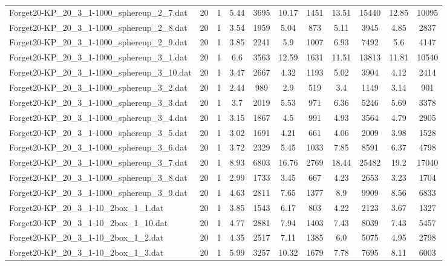 \begin{table}[!ht]
\begin{tabular}{lcccccccccc}
Forget20-KP\_20\_3\_1-1000\_sphereup\_2\_7.dat & 20 & 1 & 5.44 & 3695 & 10.17 & 1451 & 13.51 & 15440 & 12.85 & 10095 \\
Forget20-KP\_20\_3\_1-1000\_sphereup\_2\_8.dat & 20 & 1 & 3.54 & 1959 & 5.04 & 873 & 5.11 & 3945 & 4.85 & 2837 \\
Forget20-KP\_20\_3\_1-1000\_sphereup\_2\_9.dat & 20 & 1 & 3.85 & 2241 & 5.9 & 1007 & 6.93 & 7492 & 5.6 & 4147 \\
Forget20-KP\_20\_3\_1-1000\_sphereup\_3\_1.dat & 20 & 1 & 6.6 & 3563 & 12.59 & 1631 & 11.51 & 13813 & 11.81 & 10540 \\
Forget20-KP\_20\_3\_1-1000\_sphereup\_3\_10.dat & 20 & 1 & 3.47 & 2667 & 4.32 & 1193 & 5.02 & 3904 & 4.12 & 2414 \\
Forget20-KP\_20\_3\_1-1000\_sphereup\_3\_2.dat & 20 & 1 & 2.44 & 989 & 2.9 & 519 & 3.4 & 1149 & 3.14 & 901 \\
Forget20-KP\_20\_3\_1-1000\_sphereup\_3\_3.dat & 20 & 1 & 3.7 & 2019 & 5.53 & 971 & 6.36 & 5246 & 5.69 & 3378 \\
Forget20-KP\_20\_3\_1-1000\_sphereup\_3\_4.dat & 20 & 1 & 3.15 & 1867 & 4.5 & 991 & 4.93 & 3564 & 4.79 & 2905 \\
Forget20-KP\_20\_3\_1-1000\_sphereup\_3\_5.dat & 20 & 1 & 3.02 & 1691 & 4.21 & 661 & 4.06 & 2009 & 3.98 & 1528 \\
Forget20-KP\_20\_3\_1-1000\_sphereup\_3\_6.dat & 20 & 1 & 3.72 & 2329 & 5.45 & 1033 & 7.85 & 8591 & 6.37 & 4798 \\
Forget20-KP\_20\_3\_1-1000\_sphereup\_3\_7.dat & 20 & 1 & 8.93 & 6803 & 16.76 & 2769 & 18.44 & 25482 & 19.2 & 17040 \\
Forget20-KP\_20\_3\_1-1000\_sphereup\_3\_8.dat & 20 & 1 & 2.99 & 1733 & 3.45 & 667 & 4.23 & 2653 & 3.23 & 1704 \\
Forget20-KP\_20\_3\_1-1000\_sphereup\_3\_9.dat & 20 & 1 & 4.63 & 2811 & 7.65 & 1377 & 8.9 & 9909 & 8.56 & 6833 \\
Forget20-KP\_20\_3\_1-10\_2box\_1\_1.dat & 20 & 1 & 3.85 & 1543 & 6.17 & 803 & 4.22 & 2123 & 3.67 & 1327 \\
Forget20-KP\_20\_3\_1-10\_2box\_1\_10.dat & 20 & 1 & 4.77 & 2881 & 7.94 & 1403 & 7.43 & 8039 & 7.43 & 5457 \\
Forget20-KP\_20\_3\_1-10\_2box\_1\_2.dat & 20 & 1 & 4.35 & 2517 & 7.11 & 1385 & 6.0 & 5075 & 4.95 & 2798 \\
Forget20-KP\_20\_3\_1-10\_2box\_1\_3.dat & 20 & 1 & 5.99 & 3257 & 10.32 & 1679 & 7.78 & 7695 & 8.11 & 6003 \\

\end{tabular}
\end{table}

